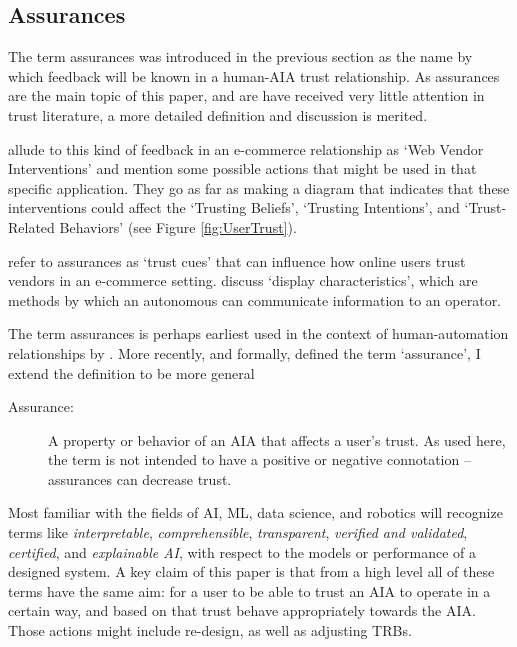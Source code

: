 \subsection{Assurances}
    The term assurances was introduced in the previous section as the name by which feedback will be known in a human-AIA trust relationship. As assurances are the main topic of this paper, and are have received very little attention in trust literature, a more detailed definition and discussion is merited.

    \citet{McKnight2001-fa} allude to this kind of feedback in an e-commerce relationship as `Web Vendor Interventions' and mention some possible actions that might be used in that specific application. They go as far as making a diagram that indicates that these interventions could affect the `Trusting Beliefs', `Trusting Intentions', and `Trust-Related Behaviors' (see Figure \ref{fig:UserTrust}).

    \citet{Corritore2003-gx} refer to assurances as `trust cues' that can influence how online users trust vendors in an e-commerce setting. \citet{Lee2004-pv} discuss `display characteristics', which are methods by which an autonomous can communicate information to an operator.
    
    The term assurances is perhaps earliest used in the context of human-automation relationships by \citet{Sheridan1984-kx}. More recently, and formally, \citet{Lillard2016-yg} defined the term `assurance', I extend the definition to be more general
    
    \begin{description}
        \item [Assurance:] A property or behavior of an AIA that affects a user's trust. As used here, the term is not intended to have a positive or negative connotation -- assurances can decrease trust.
    \end{description}

    Most familiar with the fields of AI, ML, data science, and robotics will recognize terms like \emph{interpretable}, \emph{comprehensible}, \emph{transparent}, \emph{verified and validated}, \emph{certified}, and \emph{explainable AI}, with respect to the models or performance of a designed system. A key claim of this paper is that from a high level all of these terms have the same aim: for a user to be able to trust an AIA to operate in a certain way, and based on that trust behave appropriately towards the AIA. Those actions might include re-design, as well as adjusting TRBs.
%

